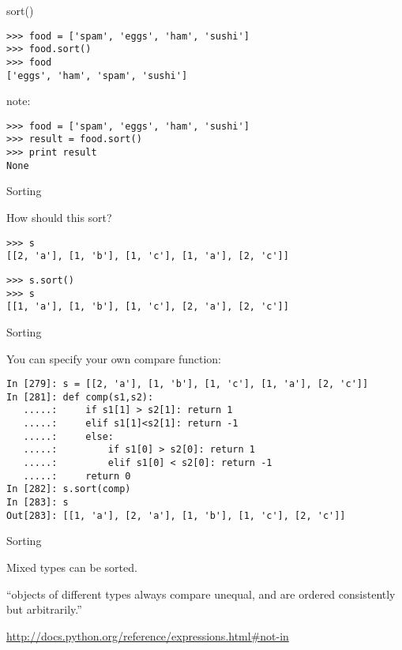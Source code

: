 \documentclass{beamer}
\begin{document}
\begin{frame}[fragile]{sort()}

\vfill
\begin{verbatim}
>>> food = ['spam', 'eggs', 'ham', 'sushi']
>>> food.sort()
>>> food
['eggs', 'ham', 'spam', 'sushi']
\end{verbatim}

\vfill
{\Large note:}

\vfill
\begin{verbatim}
>>> food = ['spam', 'eggs', 'ham', 'sushi']
>>> result = food.sort()
>>> print result
None
\end{verbatim}

\vfill
\end{frame} 

\begin{frame}[fragile]{Sorting}

{\large How should this sort?}

\begin{verbatim}
>>> s
[[2, 'a'], [1, 'b'], [1, 'c'], [1, 'a'], [2, 'c']]
\end{verbatim}

\pause

\begin{verbatim}
>>> s.sort()
>>> s
[[1, 'a'], [1, 'b'], [1, 'c'], [2, 'a'], [2, 'c']]
\end{verbatim}

\end{frame} 

\begin{frame}[fragile]{Sorting}

{\large You can specify your own compare function:}

\begin{verbatim}
In [279]: s = [[2, 'a'], [1, 'b'], [1, 'c'], [1, 'a'], [2, 'c']]
In [281]: def comp(s1,s2):
   .....:     if s1[1] > s2[1]: return 1
   .....:     elif s1[1]<s2[1]: return -1
   .....:     else:
   .....:         if s1[0] > s2[0]: return 1
   .....:         elif s1[0] < s2[0]: return -1
   .....:     return 0
In [282]: s.sort(comp)
In [283]: s
Out[283]: [[1, 'a'], [2, 'a'], [1, 'b'], [1, 'c'], [2, 'c']]
\end{verbatim}
\end{frame} 

\begin{frame}[fragile]{Sorting}

{\Large
Mixed types can be sorted.
}
\vfill
{\center \Large

``objects of different types always compare unequal, and are ordered
consistently but arbitrarily.''

}

\vfill
\url{http://docs.python.org/reference/expressions.html#not-in}
\end{frame} 
\end{document}
